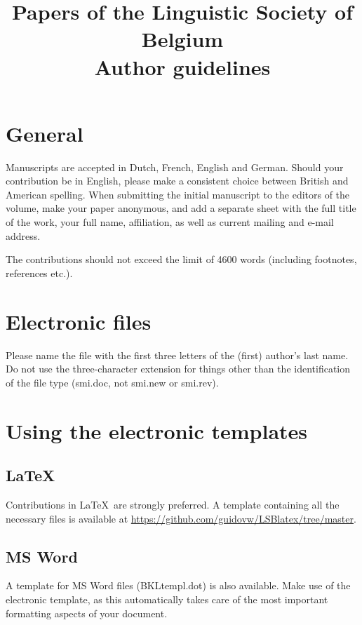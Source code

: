 \documentclass[times,linguex]{lsb}
\title[short title]{Papers of the Linguistic Society of Belgium\\ Author guidelines}
\author[Guido Vanden Wyngaerd]%
{
\spauthor{Guido Vanden Wyngaerd \\ \institute{KU Leuven}} 
}
\begin{document}
\maketitle

\begin{abstract} \normalsize  \lipsum[1]
\end{abstract}

\clearpage

\section{General}

Manuscripts are accepted in Dutch, French, English and German. Should your contribution be in English, please make a consistent choice between British and American spelling. When submitting the initial manuscript to the editors of the volume, make your paper anonymous, and  add a separate sheet with the full title of the work, your full name, affiliation, as well as current mailing and e-mail address.

The contributions should not exceed the limit of 4600 words (including footnotes, references etc.). 

\section{Electronic files}

Please name the file with the first three letters of the (first) author’s last name. Do not use the three-character extension for things other than the identification of the file type (smi.doc, not smi.new or smi.rev). 

\section{Using the electronic templates}

\subsection{\LaTeX\ }
Contributions in \LaTeX\ are strongly preferred. A template containing all the necessary files is available at \url{https://github.com/guidovw/LSBlatex/tree/master}. 

\subsection{MS Word}

A template for MS Word files (BKLtempl.dot) is also available. Make use of the electronic template, as this automatically takes care of the most important formatting aspects of your document. 
\end{document}
